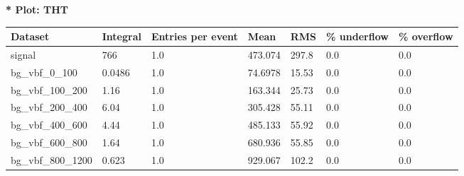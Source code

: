 \documentclass[a4paper, 10pt]{article}
\begin{document}
\textbf{* Plot: THT}\\
   \begin{table}[H]
  \begin{center}
    \begin{tabular}{|m{23.0mm}|m{23.0mm}|m{18.0mm}|m{19.0mm}|m{19.0mm}|m{19.0mm}|m{19.0mm}|}
      \hline
      {\cellcolor{yellow}         Dataset}& {\cellcolor{yellow}         Integral}& {\cellcolor{yellow}         Entries per event}& {\cellcolor{yellow}         Mean}& {\cellcolor{yellow}         RMS}& {\cellcolor{yellow}         \% underflow}& {\cellcolor{yellow}         \% overflow}\\
      \hline
      {\cellcolor{white}         signal}& {\cellcolor{white}         766}& {\cellcolor{white}         1.0}& {\cellcolor{white}         473.074}& {\cellcolor{white}         297.8}& {\cellcolor{green}         0.0}& {\cellcolor{green}         0.0}\\
      \hline
      {\cellcolor{white}         bg\_vbf\_0\_100}& {\cellcolor{white}         0.0486}& {\cellcolor{white}         1.0}& {\cellcolor{white}         74.6978}& {\cellcolor{white}         15.53}& {\cellcolor{green}         0.0}& {\cellcolor{green}         0.0}\\
      \hline
      {\cellcolor{white}         bg\_vbf\_100\_200}& {\cellcolor{white}         1.16}& {\cellcolor{white}         1.0}& {\cellcolor{white}         163.344}& {\cellcolor{white}         25.73}& {\cellcolor{green}         0.0}& {\cellcolor{green}         0.0}\\
      \hline
      {\cellcolor{white}         bg\_vbf\_200\_400}& {\cellcolor{white}         6.04}& {\cellcolor{white}         1.0}& {\cellcolor{white}         305.428}& {\cellcolor{white}         55.11}& {\cellcolor{green}         0.0}& {\cellcolor{green}         0.0}\\
      \hline
      {\cellcolor{white}         bg\_vbf\_400\_600}& {\cellcolor{white}         4.44}& {\cellcolor{white}         1.0}& {\cellcolor{white}         485.133}& {\cellcolor{white}         55.92}& {\cellcolor{green}         0.0}& {\cellcolor{green}         0.0}\\
      \hline
      {\cellcolor{white}         bg\_vbf\_600\_800}& {\cellcolor{white}         1.64}& {\cellcolor{white}         1.0}& {\cellcolor{white}         680.936}& {\cellcolor{white}         55.85}& {\cellcolor{green}         0.0}& {\cellcolor{green}         0.0}\\
      \hline
      {\cellcolor{white}         bg\_vbf\_800\_1200}& {\cellcolor{white}         0.623}& {\cellcolor{white}         1.0}& {\cellcolor{white}         929.067}& {\cellcolor{white}         102.2}& {\cellcolor{green}         0.0}& {\cellcolor{green}         0.0}\\

\end{tabular}
\end{center}
\end{table}
\end{document}
